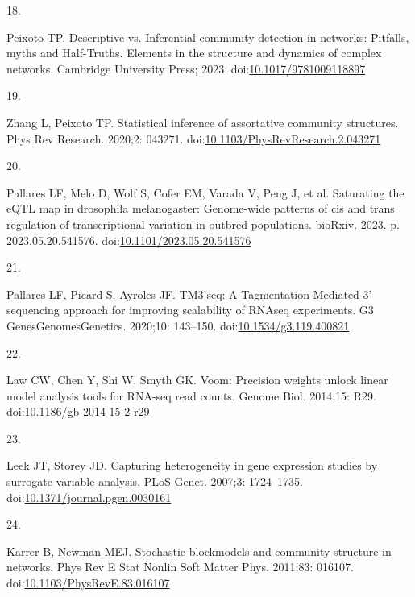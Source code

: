\documentclass[
]{article}
\newlength{\cslhangindent}
\newlength{\csllabelwidth}
\newenvironment{CSLReferences}[2] %
 {\begin{list}{}{%
  \setlength{\itemindent}{0pt}
  \setlength{\leftmargin}{0pt}
  \setlength{\parsep}{0pt}
  \ifodd #1
   \setlength{\leftmargin}{\cslhangindent}
   \setlength{\itemindent}{-1\cslhangindent}
  \fi
  \setlength{\itemsep}{#2\baselineskip}}}
 {\end{list}}
\newcommand{\CSLLeftMargin}[1]{\parbox[t]{\csllabelwidth}{\strut#1\strut}}
\newcommand{\CSLRightInline}[1]{\parbox[t]{\linewidth - \csllabelwidth}{\strut#1\strut}}
\begin{document}
\begin{CSLReferences}{0}{1}
\CSLLeftMargin{18. }%
\CSLRightInline{Peixoto TP. Descriptive vs. Inferential community
detection in networks: Pitfalls, myths and {Half-Truths}. Elements in
the structure and dynamics of complex networks. Cambridge University
Press; 2023.
doi:\href{https://doi.org/10.1017/9781009118897}{10.1017/9781009118897}}

\CSLLeftMargin{19. }%
\CSLRightInline{Zhang L, Peixoto TP. Statistical inference of
assortative community structures. Phys Rev Research. 2020;2: 043271.
doi:\href{https://doi.org/10.1103/PhysRevResearch.2.043271}{10.1103/PhysRevResearch.2.043271}}

\CSLLeftMargin{20. }%
\CSLRightInline{Pallares LF, Melo D, Wolf S, Cofer EM, Varada V, Peng J,
et al. Saturating the {eQTL} map in drosophila melanogaster: Genome-wide
patterns of cis and trans regulation of transcriptional variation in
outbred populations. bioRxiv. 2023. p. 2023.05.20.541576.
doi:\href{https://doi.org/10.1101/2023.05.20.541576}{10.1101/2023.05.20.541576}}

\CSLLeftMargin{21. }%
\CSLRightInline{Pallares LF, Picard S, Ayroles JF. {TM3'seq}: A
{Tagmentation-Mediated} 3' sequencing approach for improving scalability
of {RNAseq} experiments. G3 Genes\textbar Genomes\textbar Genetics.
2020;10: 143--150.
doi:\href{https://doi.org/10.1534/g3.119.400821}{10.1534/g3.119.400821}}

\CSLLeftMargin{22. }%
\CSLRightInline{Law CW, Chen Y, Shi W, Smyth GK. Voom: Precision weights
unlock linear model analysis tools for {RNA-seq} read counts. Genome
Biol. 2014;15: R29.
doi:\href{https://doi.org/10.1186/gb-2014-15-2-r29}{10.1186/gb-2014-15-2-r29}}

\CSLLeftMargin{23. }%
\CSLRightInline{Leek JT, Storey JD. Capturing heterogeneity in gene
expression studies by surrogate variable analysis. PLoS Genet. 2007;3:
1724--1735.
doi:\href{https://doi.org/10.1371/journal.pgen.0030161}{10.1371/journal.pgen.0030161}}

\CSLLeftMargin{24. }%
\CSLRightInline{Karrer B, Newman MEJ. Stochastic blockmodels and
community structure in networks. Phys Rev E Stat Nonlin Soft Matter
Phys. 2011;83: 016107.
doi:\href{https://doi.org/10.1103/PhysRevE.83.016107}{10.1103/PhysRevE.83.016107}}


\end{CSLReferences}
\end{document}
